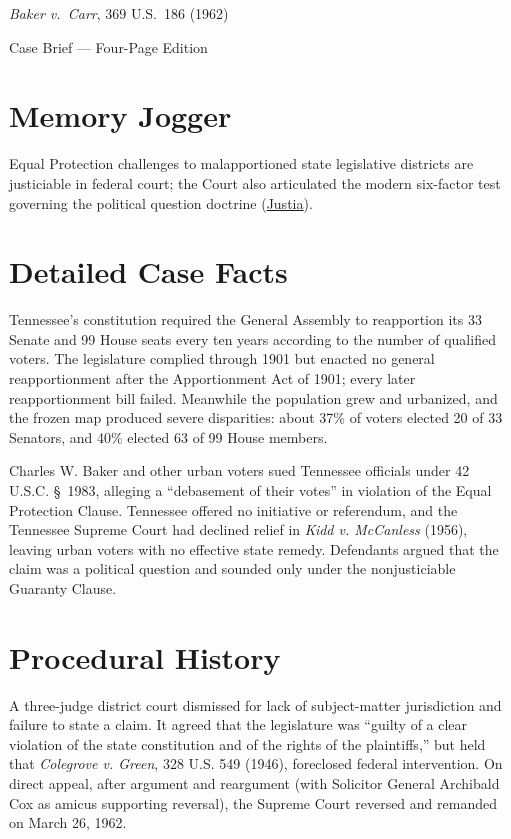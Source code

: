 \documentclass[12pt]{article}
\begin{document}
\begin{center}
{\LARGE \textit{Baker v.\ Carr}, 369 U.S.\ 186 (1962)\par}
\vspace{0.8em}
{\large Case Brief --- Four-Page Edition\par}
\end{center}
\vspace{1em}

\section{Memory Jogger}

Equal Protection challenges to malapportioned state legislative districts are justiciable in federal court; the Court also articulated the modern six-factor test governing the political question doctrine (\href{https://supreme.justia.com/cases/federal/us/369/186/}{Justia}).

\section{Detailed Case Facts}

Tennessee's constitution required the General Assembly to reapportion its 33 Senate and 99 House seats every ten years according to the number of qualified voters. The legislature complied through 1901 but enacted no general reapportionment after the Apportionment Act of 1901; every later reapportionment bill failed. Meanwhile the population grew and urbanized, and the frozen map produced severe disparities: about 37\% of voters elected 20 of 33 Senators, and 40\% elected 63 of 99 House members.

Charles W. Baker and other urban voters sued Tennessee officials under 42 U.S.C. \S~1983, alleging a ``debasement of their votes'' in violation of the Equal Protection Clause. Tennessee offered no initiative or referendum, and the Tennessee Supreme Court had declined relief in \textit{Kidd v. McCanless} (1956), leaving urban voters with no effective state remedy. Defendants argued that the claim was a political question and sounded only under the nonjusticiable Guaranty Clause.

\section{Procedural History}

A three-judge district court dismissed for lack of subject-matter jurisdiction and failure to state a claim. It agreed that the legislature was ``guilty of a clear violation of the state constitution and of the rights of the plaintiffs,'' but held that \textit{Colegrove v. Green}, 328 U.S. 549 (1946), foreclosed federal intervention. On direct appeal, after argument and reargument (with Solicitor General Archibald Cox as amicus supporting reversal), the Supreme Court reversed and remanded on March 26, 1962.
\end{document}
